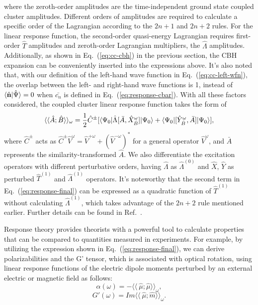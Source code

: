 where the zeroth-order amplitudes are the time-independent ground state coupled cluster amplitudes. Different orders of amplitudes are required to calculate a specific order of the Lagrangian according to the $2n+1$ and $2n+2$ rules.\cite{Kvasnivcka1980, Shavitt2009} For the linear response function, the second-order quasi-energy Lagrangian requires first-order $\hat{T}$ amplitudes and zeroth-order Lagrangian multipliers, the $\hat{\Lambda}$ amplitudes. Additionally, as shown in Eq.~(\ref{eq:cc-cbh}) in the previous section, the CBH expansion can be conveniently inserted into the expressions above. It's also noted that, with our definition of the left-hand wave function in Eq.~(\ref{eq:cc-left-wfn}), the overlap between the left- and right-hand wave functions is 1, instead of $\langle\hat{\textbf{n}} |\hat{\Psi}\rangle=0$ when $\bar{c_{n}}$ is defined in Eq.~(\ref{eq:response-cbar}). With all these factors considered, the coupled cluster linear response function takes the form of
\begin{equation}
\langle\langle \hat{A}; \hat{B}\rangle\rangle_{\omega} = 
\frac{1}{2}\hat{C}^{\pm}[\langle\Psi_{0} |\hat{\Lambda}[\bar{A},\hat{X}_{\hat{B}}^{\omega}]| \Psi_{0} \rangle +
\langle\Psi_{0} |[\hat{Y}_{\hat{B}}^{\omega},\bar{A}]| \Psi_{0} \rangle],
\label{eq:response-final}
\end{equation}
where $\hat{C}^{\pm}$ acts as $\hat{C}^{\pm}\hat{V}^{\omega}=\hat{V}^{+\omega}+(\hat{V}^{-\omega})^{*}$ for a general operator $\hat{V}^{\omega}$, and $\bar{A}$ represents the similarity-transformed $\hat{A}$. We also differentiate the excitation operators with different perturbative orders, having $\hat{\Lambda}$ as $\hat{\Lambda}^{(0)}$ and $\hat{X}$, $\hat{Y}$ as perturbed $\hat{T}^{(1)}$ and $\hat{\Lambda}^{(1)}$ operators. It's noteworthy that the second term in Eq.~(\ref{eq:response-final}) can be expressed as a quadratic function of $\hat{T}^{(1)}$ without calculating $\hat{\Lambda}^{(1)}$, which takes advantage of the $2n+2$ rule mentioned earlier. Further details can be found in Ref.~.

Response theory provides theorists with a powerful tool to calculate properties that can be compared to quantities measured in experiments. For example, by utilizing the expression shown in Eq.~(\ref{eq:response-final}), we can derive polarizabilities and the G' tensor, which is associated with optical rotation, using linear response functions of the electric dipole moments perturbed by an external electric or magnetic field\cite{Crawford2006} as follows:
\begin{equation}
\alpha(\omega) = -\langle\langle\ \hat{\mu};\hat{\mu}\rangle\rangle_{\omega},
\end{equation}
\begin{equation}
G'(\omega) = Im\langle\langle\ \hat{\mu};\hat{m}\rangle\rangle_{\omega}.
\end{equation}

